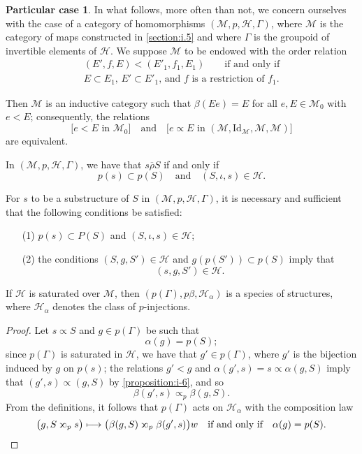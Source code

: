 \documentclass[a4paper,fleqn]{article}
\theoremstyle{plain}
\newenvironment{proposition}[1]
  {\renewcommand\theinnerproposition{#1}\innerproposition}
  {\endinnerproposition}
\theoremstyle{definition}
\newtheorem*{particular}{Particular case}
\newcommand{\oldpage}[1]{{\marginpar{\footnotesize$\bigg\vert$\,\,\,\,\textit{p.~#1}}}}
\newcommand{\textand}{\quad\text{and}\quad}
\newcommand{\HH}{\mathcal{H}}
\newcommand{\MM}{\mathcal{M}}
\newcommand{\relrhobar}{\mathrel{\overline{\rho}}}
\newcommand{\subs}{\mathrel{\propto}}
\newcommand{\sups}{\mathrel{\reflectbox{$\propto$}}}
\newcommand{\Id}{\mathrm{Id}}
\begin{document}
\begin{particular}
  In what follows, more often than not, we concern ourselves with the case of a category of homomorphisms $(\MM,p,\HH,\Gamma)$, where $\MM$ is the category of maps constructed in \cref{section:i.5} and where $\Gamma$ is the groupoid of invertible elements of $\HH$.
  We suppose $\MM$ to be endowed with the order relation
  \[
    \begin{gathered}
      (E',f,E) < (E'_1,f_1,E_1)
      \qquad\text{if and only if}
    \\\text{$E\subset E_1$, $E'\subset E'_1$, and $f$ is a restriction of $f_1$.}
    \end{gathered}
  \]

  Then $\MM$ is an inductive category such that $\beta(Ee)=E$ for all $e,E\in\MM_0$ with $e<E$;
  consequently, the relations
  \[
    \big[\text{$e<E$ in $\MM_0$}\big]
    \textand
    \big[\text{$e\subs E$ in $(\MM,\Id_\MM,\MM,\MM)$}\big]
  \]
  are equivalent.

  In $(\MM,p,\HH,\Gamma)$, we have that $s\relrhobar S$ if and only if
  \[
    p(s)\subset p(S)
    \textand
    (S,\iota,s)\in\HH.
  \]

  For $s$ to be a substructure of $S$ in $(\MM,p,\HH,\Gamma)$, it is necessary and sufficient that the following conditions be satisfied:
  \begin{enumerate}
    \item[\normalfont(1)]
      $p(s)\subset P(S)$ and $(S,\iota,s)\in\HH$;
    \item[\normalfont(2)]
      the conditions $(S,g,S')\in\HH$ and $g(p(S'))\subset p(S)$ imply that
      \[
        (s,g,S')\in\HH.
      \]
  \end{enumerate}
\end{particular}

\begin{proposition}{15}
\label{proposition:i-15}
  If $\HH$ is saturated over $\MM$, then $(p(\Gamma),p\beta,\HH_\alpha)$ is a species of structures, where $\HH_\alpha$ denotes the class of $p$-injections.
\end{proposition}

\begin{proof}
  Let $s\subs S$ and $g\in p(\Gamma)$ be such that
  \[
    \alpha(g)
    = p(S);
  \]
  since $p(\Gamma)$ is saturated in $\HH$, we have that $g'\in p(\Gamma)$, where $g'$ is the bijection induced by $g$ on $p(s)$;
  the relations $g'<g$ and $\alpha(g',s)=s\subs\alpha(g,S)$ imply that $(g',s)\subs(g,S)$ by \cref{proposition:i-6}, and so
  \[
    \beta(g',s)
    \subs_p \beta(g,S).
  \]
  \oldpage{380}
  From the definitions, it follows that $p(\Gamma)$ acts on $\HH_\alpha$ with the composition law
  \[
    \big(
      g, S\sups_p s
    \big)
    \longmapsto
    \big(
      \beta(g,S) \sups_p \beta(g',s)
    \big)w
    \quad\text{if and only if}\quad
    \alpha(g)=p(S).
    \qedhere
  \]
\end{proof}
\end{document}
